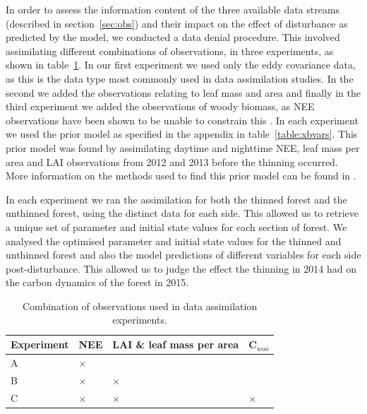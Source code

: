 \documentclass[draft,linenumbers]{agujournal}
\begin{document}
In order to assess the information content of the three available data streams (described in section~\ref{sec:obs}) and their impact on the effect of disturbance as predicted by the model, we conducted a data denial procedure. This involved assimilating different combinations of observations, in three experiments, as shown in table~\ref{table:obs_da}. In our first experiment we used only the eddy covariance data, as this is the data type most commonly used in data assimilation studies. In the second we added the observations relating to leaf mass and area and finally in the third experiment we added the observations of woody biomass, as NEE observations have been shown to be unable to constrain this \citep{fox2009reflex}. In each experiment we used the prior model as specified in the appendix in table~\ref{table:xbvars}. This prior model was found by assimilating daytime and nighttime NEE, leaf mass per area and LAI observations from 2012 and 2013 before the thinning occurred. More information on the methods used to find this prior model can be found in \citet{Pinnington2016299}. 


In each experiment we ran the assimilation for both the thinned forest and the unthinned forest, using the distinct data for each side. This allowed us to retrieve a unique set of parameter and initial state values for each section of forest. We analysed the optimised parameter and initial state values for the thinned and unthinned forest and also the model predictions of different variables for each side post-disturbance. This allowed us to judge the effect the thinning in 2014 had on the carbon dynamics of the forest in 2015.

\begin{table}[ht] 
	\caption{Combination of observations used in data assimilation experiments.}
\begin{center}
	\begin{tabular}{| l | l | l | l |}
	\hline
	Experiment & NEE & LAI \& leaf mass per area & C\(_{woo}\) \\ \hline
	A & \(\times\) &  &  \\ \hline
	B & \(\times\) & \(\times\) &  \\ \hline
	C & \(\times\) & \(\times\) & \(\times\)  \\ \hline
	\end{tabular}
	\label{table:obs_da}
\end{center} 
\end{table}
\end{document}

